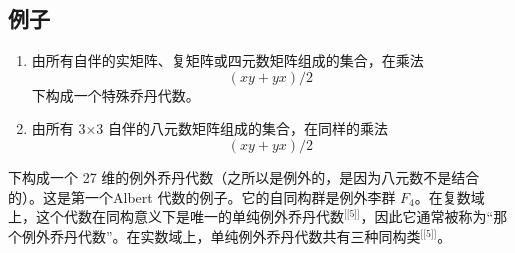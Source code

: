 \subsection{例子}
\begin{enumerate}
\item 由所有自伴的实矩阵、复矩阵或四元数矩阵组成的集合，在乘法
$$
(xy + yx) / 2~
$$
下构成一个特殊乔丹代数。
\item 由所有 3×3 自伴的八元数矩阵组成的集合，在同样的乘法
$$
(xy + yx) / 2~
$$
\end{enumerate}
下构成一个 27 维的例外乔丹代数（之所以是例外的，是因为八元数不是结合的）。这是第一个Albert 代数的例子。它的自同构群是例外李群 $F_4$。在复数域上，这个代数在同构意义下是唯一的单纯例外乔丹代数\(^\text{[[5]]}\)，因此它通常被称为“那个例外乔丹代数”。在实数域上，单纯例外乔丹代数共有三种同构类\(^\text{[[5]]}\)。
